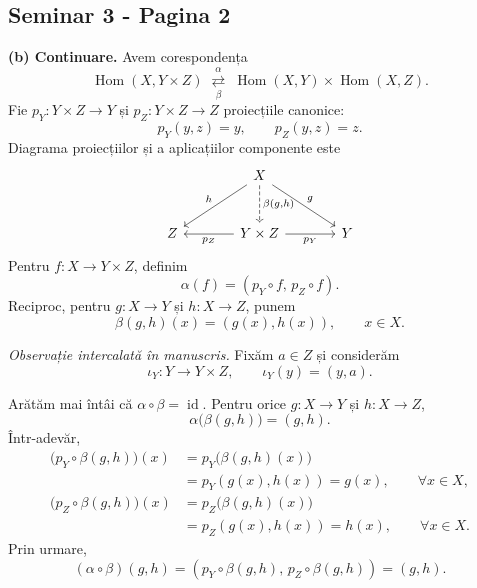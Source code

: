 
\subsection*{Seminar 3 - Pagina 2}

\noindent\textbf{(b) Continuare.} Avem corespondența
\[
  \operatorname{Hom}(X,Y\times Z)
  \;\overset{\alpha}{\underset{\beta}{\rightleftarrows}}\;
  \operatorname{Hom}(X,Y)\times\operatorname{Hom}(X,Z).
\]
Fie $p_Y:Y\times Z\to Y$ și $p_Z:Y\times Z\to Z$ proiecțiile
canonice:
\[
 p_Y(y,z)=y,\qquad p_Z(y,z)=z.
\]
Diagrama proiecțiilor și a aplicațiilor componente este
\[
\begin{tikzcd}[column sep=large, row sep=large]
 & X \arrow[dl, "h"'] \arrow[dr, "g"]
     \arrow[d, dashed, "{\beta(g,h)}"] & \\
 Z & Y\times Z \arrow[l, "p_Z"] \arrow[r, "p_Y"'] & Y
\end{tikzcd}
\]
Pentru $f:X\to Y\times Z$, definim
\[
  \alpha(f)=(p_Y\circ f,\,p_Z\circ f).
\]
Reciproc, pentru $g:X\to Y$ și $h:X\to Z$, punem
\[
  \beta(g,h)(x)=(g(x),h(x)),\qquad x\in X.
\]

\medskip
\noindent\emph{Observație intercalată în manuscris.} Fixăm $a\in Z$ și
considerăm
\[
 \iota_Y:Y\longrightarrow Y\times Z,\qquad
 \iota_Y(y)=(y,a).
\]

\medskip
\noindent Arătăm mai întâi că $\alpha\circ\beta=\operatorname{id}$.
Pentru orice $g:X\to Y$ și $h:X\to Z$,
\[
  \alpha\bigl(\beta(g,h)\bigr)=(g,h).
\]
Într-adevăr,
\[
\begin{aligned}
 \bigl(p_Y\circ\beta(g,h)\bigr)(x)
   &=p_Y\bigl(\beta(g,h)(x)\bigr) \\
   &=p_Y(g(x),h(x))=g(x),
 \qquad \forall x\in X,\\[3pt]
 \bigl(p_Z\circ\beta(g,h)\bigr)(x)
   &=p_Z\bigl(\beta(g,h)(x)\bigr) \\
   &=p_Z(g(x),h(x))=h(x),
 \qquad \forall x\in X.
\end{aligned}
\]
Prin urmare,
\[
  (\alpha\circ\beta)(g,h)
    =(p_Y\circ\beta(g,h),\,p_Z\circ\beta(g,h))
    =(g,h).
\]

